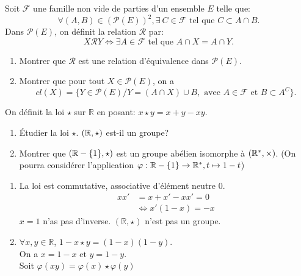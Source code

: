 \begin{exercise}[from=Devoir MPI 2017,nosol]
	Soit $\mathcal{F}$ une famille non vide de parties d'un ensemble $E$ telle que:
	\[
		\forall (A,B) \in (\mathcal{P}(E))^2,\exists~ C \in \mathcal{F} \text{ tel que } C \subset A \cap B.
    \]
    Dans $\mathcal{P}(E)$, on définit la relation $\mathcal{R}$ par:
    \[
    X\mathcal{R}Y\Leftrightarrow \exists A \in \mathcal{F} \text{ tel que } A \cap X = A \cap Y.
    \]
    \begin{enumerate}
    \item Montrer que $\mathcal{R}$ est une relation d'équivalence dans $\mathcal{P}(E)$.
    \item  Montrer que pour tout $X \in \mathcal{P}(E)$, on a
    \[
        cl(X)=\{Y \in \mathcal{P}(E)/Y=(A \cap X) \cup B , \text{ avec } A \in \mathcal{F} \text{ et } B \subset A^C \}.
    \]
    \end{enumerate}
\end{exercise}
\begin{exercise}[from=Devoir MPI 2017]
	On définit la loi $\star$ sur $\mathbb{R}$ en posant: $x \star y = x+y-xy$.
	\begin{enumerate}
		\item Étudier la loi $\star$. $(\mathbb{R}, \star)$ est-il un groupe?
		\item Montrer que $(\mathbb{R}-\{1\},\star)$ est un groupe abélien isomorphe à $(\mathbb{R}^*,\times)$. (On pourra considérer l'application $\varphi: \mathbb{R}-\{1\}\rightarrow \mathbb{R}^*,t \mapsto 1-t$)
	\end{enumerate}
	\cor
	\begin{enumerate}
		\item La loi est commutative, associative d'élément neutre 0.
		\begin{align*}
			xx'& = x+x'-xx'= 0\\
			   & \Leftrightarrow x'(1-x)=-x
		\end{align*}
		$x=1$ n'as pas d'inverse. $(\mathbb{R},\star)$ n'est pas un groupe.
		\item $\forall x,y \in \mathbb{R}$, $1-x \star y = (1-x)(1-y)$.
		\\On a $x=1-x \text{ et } y=1-y$.
		\\Soit $\varphi(xy)=\varphi(x) \star \varphi(y)$
	\end{enumerate}
\end{exercise}

